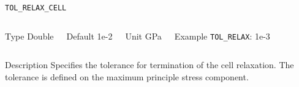 \documentclass[xcolor=dvipsnames,t]{beamer}
\begin{document}
\begin{frame}[allowframebreaks]{\texttt{TOL\_RELAX\_CELL}} \label{TOL_RELAX_CELL}
\vspace*{-12pt}
\begin{columns}
\begin{block}{Type}
Double
\end{block}

\begin{block}{Default}
1e-2
\end{block}

\begin{block}{Unit}
GPa
\end{block}

\begin{block}{Example}
\texttt{TOL\_RELAX}: 1e-3
\end{block}
\end{columns}

\begin{block}{Description}
Specifies the tolerance for termination of the cell relaxation. The tolerance is defined on the maximum principle stress component. 
\end{block}


\end{frame}
\end{document}
